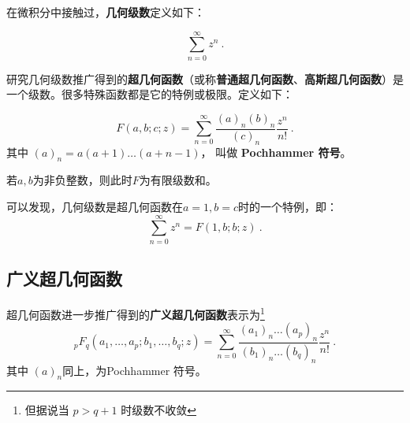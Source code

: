 

在微积分中接触过，\textbf{几何级数}定义如下：

\begin{equation}
\sum_{n=0}^\infty z^n~.
\end{equation}

研究几何级数推广得到的\textbf{超几何函数}（或称\textbf{普通超几何函数}、\textbf{高斯超几何函数}）是一个级数。很多特殊函数都是它的特例或极限。定义如下：

\begin{equation}
F(a,b;c;z) = \sum_{n=0}^\infty \frac{(a)_n(b)_n}{(c)_n} \frac{z^n}{n!}~.
\end{equation}
其中 $(a)_n = a(a+1)\dots(a+n-1)$， 叫做 \textbf{Pochhammer 符号}。

若$a,b$为非负整数，则此时$F$为有限级数和。

可以发现，几何级数是超几何函数在$a=1,b=c$时的一个特例，即：
\begin{equation}
\sum_{n=0}^\infty z^n=F(1,b;b;z)~.
\end{equation}

\subsection{广义超几何函数}

超几何函数进一步推广得到的\textbf{广义超几何函数}表示为\footnote{但据说当 $p > q+1$ 时级数不收敛}
\begin{equation}
{_pF_q}(a_1,\dots, a_p; b_1, \dots, b_q; z) = \sum_{n=0}^\infty \frac{(a_1)_n\dots (a_p)_n}{(b_1)_n\dots(b_q)_n} \frac{z^n}{n!}~.
\end{equation}
其中 $(a)_n$同上，为Pochhammer 符号。

